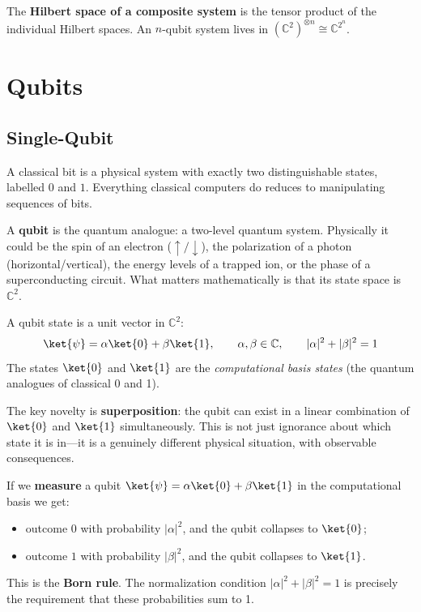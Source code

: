\documentclass[oneside]{academica}
\begin{document}
The \textbf{Hilbert space of a composite system} is the tensor product
of the individual Hilbert spaces.
An $n$-qubit system lives in
$(\mathbb{C}^2)^{\otimes n}\cong\mathbb{C}^{2^n}$.

\chapter{Qubits}

\section{Single-Qubit}

A classical bit is a physical system with exactly two distinguishable states, labelled $0$ and $1$.
Everything classical computers do reduces to manipulating sequences of bits.

A \textbf{qubit} is the quantum analogue: a two-level quantum system.
Physically it could be the spin of an electron ($\uparrow/\downarrow$), the polarization of a photon (horizontal/vertical), the energy levels of a trapped ion, or the phase of a superconducting circuit.
What matters mathematically is that its state space is $\mathbb{C}^2$.

\begin{definition*}
  A qubit state is a unit vector in $\mathbb{C}^2$:
  \begin{equation*}
    \ket{\psi} = \alpha\ket{0}+\beta\ket{1}, \qquad \alpha,\beta\in\mathbb{C},
    \qquad |\alpha|^2+|\beta|^2=1
  \end{equation*}
  The states $\ket{0}$ and $\ket{1}$ are the \emph{computational
  basis states} (the quantum analogues of classical 0 and 1).
\end{definition*}

The key novelty is \textbf{superposition}: the qubit can exist in a linear combination of $\ket{0}$ and $\ket{1}$ simultaneously.
This is not just ignorance about which state it is in---it is a genuinely different physical situation, with observable consequences.

If we \textbf{measure} a qubit $\ket{\psi}=\alpha\ket{0}+\beta\ket{1}$ in the computational basis we get:
\begin{itemize}
  \item outcome $0$ with probability $|\alpha|^2$, and the qubit
    collapses to $\ket{0}$;
  \item outcome $1$ with probability $|\beta|^2$, and the qubit
    collapses to $\ket{1}$.
\end{itemize}
This is the \textbf{Born rule}.
The normalization condition $|\alpha|^2+|\beta|^2=1$ is precisely the requirement that these probabilities sum to 1.
\end{document}
